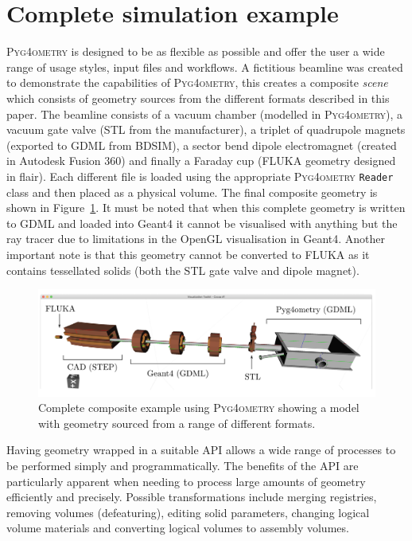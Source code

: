 \documentclass[final,5p,times,twocolumn]{elsarticle}
\newcommand{\pyinline}[1]{\lstinline[postbreak={}]{#1}}
\newcommand{\PYGEOMETRY}{\textsc{Pyg4ometry}}
\begin{document}
\section{Complete simulation example}
\PYGEOMETRY{} is designed to be as flexible as possible and offer the user a wide range of usage styles, input files
and workflows. A fictitious beamline was created to demonstrate the capabilities of \PYGEOMETRY, this creates a composite
\emph{scene} which consists of geometry sources from the different formats described in this paper. The beamline consists of a vacuum chamber
(modelled in \PYGEOMETRY{}), a vacuum gate valve (STL from the manufacturer), a triplet of quadrupole magnets (exported to GDML
from BDSIM), a sector bend dipole electromagnet (created in Autodesk Fusion 360) and finally a Faraday cup (FLUKA geometry designed in
flair). Each different file is loaded using the appropriate \PYGEOMETRY{} \pyinline{Reader} class and then placed as a physical volume. The final composite
geometry is shown in Figure~\ref{fig:model}. It must be noted that when this complete geometry is written to GDML and loaded into
Geant4 it cannot be visualised with anything but the ray tracer due to limitations in the OpenGL visualisation in Geant4. Another
important note is that this geometry cannot be converted to FLUKA as it contains tessellated solids (both the STL gate valve and
dipole magnet).
%
\begin{figure}
\begin{center}
\includegraphics[width=1.0\textwidth]{./model-scene/model.pdf}
\caption{Complete composite example using \PYGEOMETRY{} showing a model with geometry sourced from a range of different formats.}
\label{fig:model}
\end{center}
\end{figure}

Having geometry wrapped in a suitable API allows a wide range of processes to be performed simply and programmatically. The benefits of the API are
particularly apparent when needing to process large amounts of geometry efficiently and precisely. Possible transformations include merging registries,
removing volumes (defeaturing), editing solid parameters, changing logical volume materials and converting logical volumes to assembly volumes.
\end{document}
